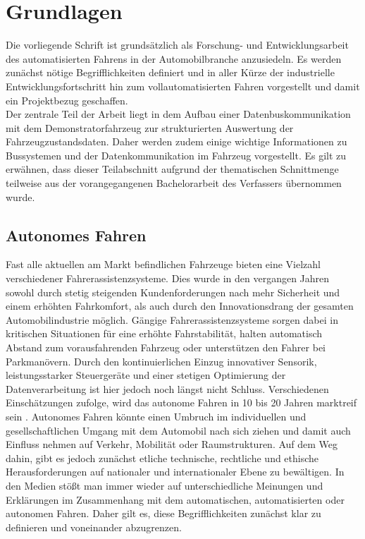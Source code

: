 \chapter{Grundlagen} \label{cha:grundlagen}
Die vorliegende Schrift ist grundsätzlich als Forschung- und Entwicklungsarbeit des automatisierten Fahrens in der Automobilbranche anzusiedeln. Es werden zunächst nötige Begrifflichkeiten definiert und in aller Kürze der industrielle Entwicklungsfortschritt hin zum vollautomatisierten Fahren vorgestellt und damit ein Projektbezug geschaffen.\\
Der zentrale Teil der Arbeit liegt in dem Aufbau einer Datenbuskommunikation mit dem Demonstratorfahrzeug zur strukturierten Auswertung der Fahrzeugzustandsdaten. Daher werden zudem einige wichtige Informationen zu Bussystemen und der Datenkommunikation im Fahrzeug vorgestellt. Es gilt zu erwähnen, dass dieser Teilabschnitt aufgrund der thematischen Schnittmenge teilweise aus der vorangegangenen Bachelorarbeit \cite{Kary.12.09.2016} des Verfassers übernommen wurde.

\section{Autonomes Fahren} \label{sec:AutonomesFahren}
Fast alle aktuellen am Markt befindlichen Fahrzeuge bieten eine Vielzahl verschiedener Fahrerassistenzsysteme. Dies wurde in den vergangen Jahren sowohl durch stetig steigenden Kundenforderungen nach mehr Sicherheit und einem erhöhten Fahrkomfort, als auch durch den Innovationsdrang der gesamten Automobilindustrie möglich. Gängige Fahrerassistenzsysteme sorgen dabei in kritischen Situationen für eine erhöhte Fahrstabilität, halten automatisch Abstand zum vorausfahrenden Fahrzeug oder unterstützen den Fahrer bei Parkmanövern. Durch den kontinuierlichen Einzug innovativer Sensorik, leistungsstarker Steuergeräte und einer stetigen Optimierung der Datenverarbeitung ist hier jedoch noch längst nicht Schluss. Verschiedenen Einschätzungen zufolge, wird das autonome Fahren in 10 bis 20 Jahren  marktreif sein \cite{Winner.2015}. Autonomes Fahren könnte einen Umbruch im individuellen und gesellschaftlichen Umgang mit dem Automobil nach sich ziehen und damit auch Einfluss nehmen auf Verkehr, Mobilität oder Raumstrukturen. Auf dem Weg dahin, gibt es jedoch zunächst etliche technische, rechtliche und ethische Herausforderungen auf nationaler und internationaler Ebene zu bewältigen. In den Medien stößt man immer wieder auf unterschiedliche Meinungen und Erklärungen im Zusammenhang mit dem automatischen, automatisierten oder autonomen Fahren. Daher gilt es, diese Begrifflichkeiten zunächst klar zu definieren und voneinander abzugrenzen. 

